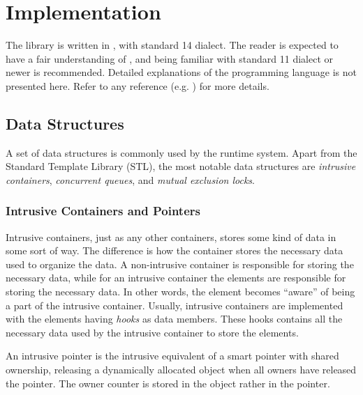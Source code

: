 

\chapter{Implementation}
\label{ch:implementation}


The library is written in \Cpp{}, with standard \Cpp{}14 dialect. The reader is expected to have a fair understanding of \Cpp{}, and being familiar with standard \Cpp{}11 dialect or newer is recommended. Detailed explanations of the \Cpp{} programming language is not presented here. Refer to any \Cpp{} reference (e.g. \citet{stroustrup2013c++}) for more details.


\section{Data Structures}
\label{sec:data_structures}


A set of data structures is commonly used by the runtime system. Apart from the \Cpp{} Standard Template Library (STL), the most notable data structures are \textit{intrusive containers}, \textit{concurrent queues}, and \textit{mutual exclusion locks}.


\subsection{Intrusive Containers and Pointers}


Intrusive containers, just as any other containers, stores some kind of data in some sort of way. The difference is how the container stores the necessary data used to organize the data. A non\hyp{}intrusive container is responsible for storing the necessary data, while for an intrusive container the elements are responsible for storing the necessary data. In other words, the element becomes ``aware'' of being a part of the intrusive container. Usually, intrusive containers are implemented with the elements having \textit{hooks} as data members. These hooks contains all the necessary data used by the intrusive container to store the elements. 

An intrusive pointer is the intrusive equivalent of a smart pointer with shared ownership, releasing a dynamically allocated object when all owners have released the pointer. The owner counter is stored in the object rather in the pointer.

